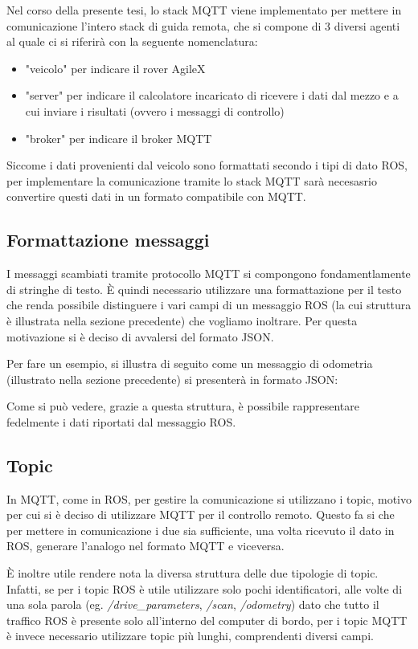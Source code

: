 \noindent Nel corso della presente tesi, lo stack MQTT viene implementato per mettere in comunicazione l'intero stack di guida remota, che si compone di 3 diversi agenti al quale ci si riferirà con la seguente nomenclatura:
\begin{itemize}
    \item "veicolo" per indicare il rover AgileX
    \item "server" per indicare il calcolatore incaricato di ricevere i dati dal mezzo e a cui inviare i risultati (ovvero i messaggi di controllo)
    \item "broker" per indicare il broker MQTT
\end{itemize}
Siccome i dati provenienti dal veicolo sono formattati secondo i tipi di dato ROS, per implementare la comunicazione tramite lo stack MQTT sarà necesasrio convertire questi dati in un formato compatibile con MQTT.

\subsection{Formattazione messaggi}
I messaggi scambiati tramite protocollo MQTT si compongono fondamentlamente di stringhe di testo. È quindi necessario utilizzare una formattazione per il testo che renda possibile distinguere i vari campi di un messaggio ROS (la cui struttura è illustrata nella sezione precedente) che vogliamo inoltrare. Per questa motivazione si è deciso di avvalersi del formato JSON.

\noindent Per fare un esempio, si illustra di seguito come un messaggio di odometria (illustrato nella sezione precedente) si presenterà in formato JSON:



\noindent Come si può vedere, grazie a questa struttura, è possibile rappresentare fedelmente i dati riportati dal messaggio ROS.

\subsection{Topic} \label{mqtt_topic}
In MQTT, come in ROS, per gestire la comunicazione si utilizzano i topic, motivo per cui si è deciso di utilizzare MQTT per il controllo remoto. Questo fa si che per mettere in comunicazione i due sia sufficiente, una volta ricevuto il dato in ROS, generare l'analogo nel formato MQTT e viceversa.     

\noindent È inoltre utile rendere nota la diversa struttura delle due tipologie di topic. Infatti, se per i topic ROS è utile utilizzare solo pochi identificatori, alle volte di una sola parola (eg. \textit{/drive\_parameters}, \textit{/scan}, \textit{/odometry}) dato che tutto il traffico ROS è presente solo all'interno del computer di bordo, per i topic MQTT è invece necessario utilizzare topic più lunghi, comprendenti diversi campi.

